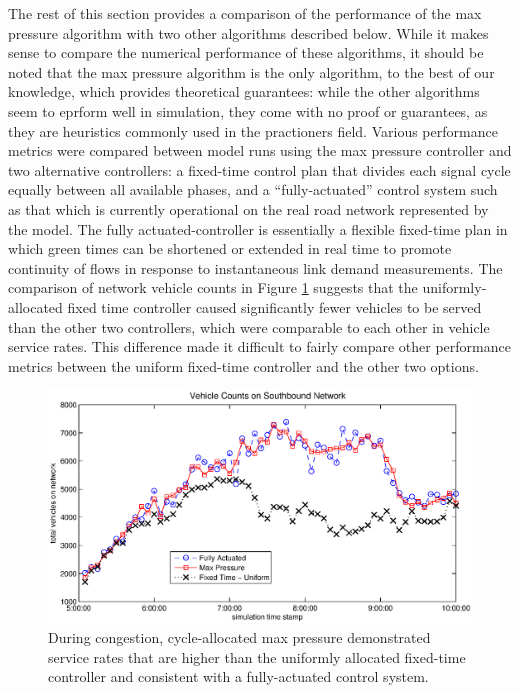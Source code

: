 The rest of this section provides a comparison of the performance of the max pressure algorithm with two other algorithms described below. While it makes sense to compare the numerical performance of these algorithms, it should be noted that the max pressure algorithm is the only algorithm, to the best of our knowledge, which provides theoretical guarantees: while the other algorithms seem to eprform well in simulation, they come with no proof or guarantees, as they are heuristics commonly used in the practioners field.
Various performance metrics were compared between model runs using the max pressure controller and two alternative controllers: a fixed-time control plan that divides each signal cycle equally between all available phases, and a ``fully-actuated'' control system such as that which is currently operational on the real road network represented by the model. The fully actuated-controller is essentially a flexible fixed-time plan in which green times can be shortened or extended in real time to promote continuity of flows in response to instantaneous link demand measurements. 
The comparison of network vehicle counts in Figure \ref{fig_counts} suggests that the uniformly-allocated fixed time controller caused significantly fewer vehicles to be served than the other two controllers, which were comparable to each other in vehicle service rates. This difference made it difficult to fairly compare other performance metrics between the uniform fixed-time controller and the other two options. 
\begin{figure}[h!]
\centering
\includegraphics[width=\columnwidth]{./VehicleCountsPlot.eps}
\vspace{-2em}
\caption{During congestion, cycle-allocated max pressure demonstrated service rates that are higher than the uniformly allocated fixed-time controller and consistent with a fully-actuated control system.  \label{fig_counts}}
\end{figure}

